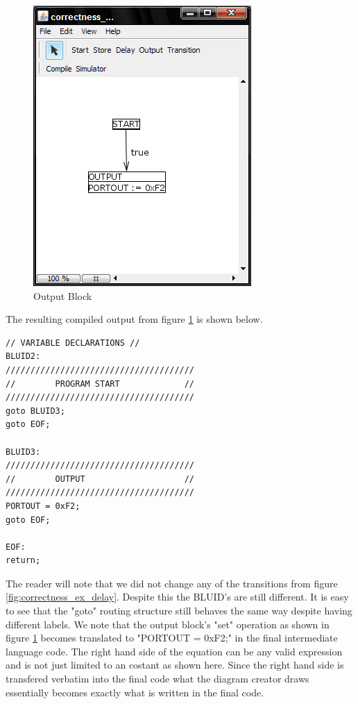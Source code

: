 \begin{figure}[htb]
	\centering
	\includegraphics[width=\imgmedphoto]{./images/correctness_ex_output.png}
	\caption{Output Block}
	\label{fig:correctness_ex_output}
\end{figure}

The resulting compiled output from figure \ref{fig:correctness_ex_output} is shown below.

\begin{minipage}{\textwidth}
\begin{lstlisting}[frame=single]
// VARIABLE DECLARATIONS //
BLUID2:
//////////////////////////////////////
//        PROGRAM START             //
//////////////////////////////////////
goto BLUID3;
goto EOF;

BLUID3:
//////////////////////////////////////
//        OUTPUT                    //
//////////////////////////////////////
PORTOUT = 0xF2;
goto EOF;

EOF:
return;
\end{lstlisting}
\end{minipage}

The reader will note that we did not change any of the transitions from figure \ref{fig:correctness_ex_delay}. Despite this the BLUID's are still different. It is easy to see that the "goto" routing structure still behaves the same way despite having different labels. We note that the output block's "set" operation as shown in figure \ref{fig:correctness_ex_output} becomes translated to "PORTOUT = 0xF2;" in the final intermediate language code. The right hand side of the equation can be any valid expression and is not just limited to an costant as shown here. Since the right hand side is transfered verbatim into the final code what the diagram creator draws essentially becomes exactly what is written in the final code.

